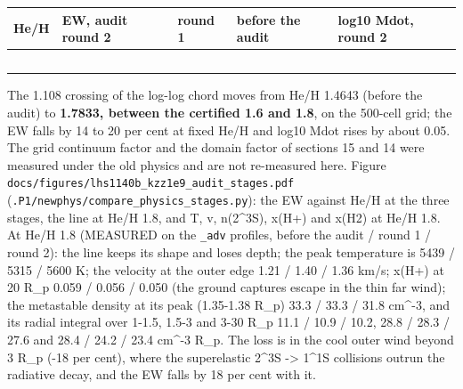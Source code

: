 \documentclass[english,a4paper]{my_memo}
\begin{document}
{\def\LTcaptype{none} %
{\small
\begin{longtable}[]{@{}>{\raggedright\arraybackslash}p{\dimexpr(\linewidth-10\tabcolsep)/5\relax}>{\raggedright\arraybackslash}p{\dimexpr(\linewidth-10\tabcolsep)/5\relax}>{\raggedright\arraybackslash}p{\dimexpr(\linewidth-10\tabcolsep)/5\relax}>{\raggedright\arraybackslash}p{\dimexpr(\linewidth-10\tabcolsep)/5\relax}>{\raggedright\arraybackslash}p{\dimexpr(\linewidth-10\tabcolsep)/5\relax}@{}}
\toprule\noalign{}
He/H & EW, audit round 2 & round 1 & before the audit & log10 Mdot, round 2 \\
\midrule\noalign{}
\endhead
\bottomrule\noalign{}
\endlastfoot
1.45 & 0.9387 & 0.9813 & 1.0964 & 7.899 \\
1.52 & 0.9776 & 1.0185 & 1.1532 & 7.906 \\
1.6 & 1.0198 & 1.0587 & 1.2155 & 7.913 \\
1.8 & 1.1159 & 1.1500 & 1.3584 & 7.927 \\
2.13 & 1.2497 & 1.2765 & 1.5604 & 7.945 \\
\end{longtable}
}
}

The 1.108 crossing of the log-log chord moves from He/H 1.4643 (before the
audit) to \textbf{1.7833, between the certified 1.6 and 1.8}, on the 500-cell
grid; the EW falls by 14 to 20 per cent at fixed He/H and log10 Mdot rises
by about 0.05. The grid continuum factor and the domain factor of sections
15 and 14 were measured under the old physics and are not re-measured here.
Figure \texttt{docs/figures/lhs1140b\_kzz1e9\_audit\_stages.pdf}
(\texttt{.P1/newphys/compare\_physics\_stages.py}): the EW against He/H at the three
stages, the line at He/H 1.8, and T, v, n(2\^{}3S), x(H+) and x(H2) at He/H 1.8.
At He/H 1.8 (MEASURED on the \texttt{\_adv} profiles, before the audit / round 1 /
round 2): the line keeps its shape and loses depth; the peak temperature is
5439 / 5315 / 5600 K; the velocity at the outer edge 1.21 / 1.40 / 1.36
km/s; x(H+) at 20 R\_p 0.059 / 0.056 / 0.050 (the ground captures escape in
the thin far wind); the metastable density at its peak (1.35-1.38 R\_p) 33.3 /
33.3 / 31.8 cm\^{}-3, and its radial integral over 1-1.5, 1.5-3 and 3-30 R\_p
11.1 / 10.9 / 10.2, 28.8 / 28.3 / 27.6 and 28.4 / 24.2 / 23.4 cm\^{}-3 R\_p. The
loss is in the cool outer wind beyond 3 R\_p (-18 per cent), where the
superelastic 2\^{}3S -\textgreater{} 1\^{}1S collisions outrun the radiative decay, and the EW
falls by 18 per cent with it.
\end{document}

